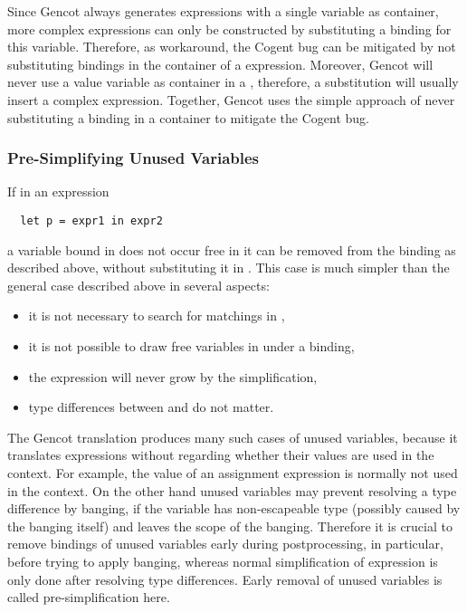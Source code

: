 Since Gencot always generates  expressions with a single variable as container, more complex expressions can
only be constructed by substituting a binding for this variable. Therefore, as workaround, the Cogent bug can be mitigated by
not substituting bindings in the container of a  expression. Moreover, Gencot will never use a value variable
as container in a , therefore, a substitution will usually insert a complex expression. Together, Gencot uses the
simple approach of never substituting a binding in a  container to mitigate the Cogent bug.

\subsubsection{Pre-Simplifying Unused Variables}

If in an expression
\begin{verbatim}
  let p = expr1 in expr2
\end{verbatim}
a variable bound in  does not occur free in  it can be removed from the binding  as described above,
without substituting it in . This case is much simpler than the general case described above in several aspects:
\begin{itemize}
\item it is not necessary to search for matchings in ,
\item it is not possible to draw free variables in  under a binding,
\item the expression will never grow by the simplification,
\item type differences between  and  do not matter.
\end{itemize}

The Gencot translation produces many such cases of unused variables, because it translates expressions without regarding whether
their values are used in the context. For example, the value of an assignment expression is normally not used in the context. On the
other hand unused variables may prevent resolving a type difference by banging, if the variable has non-escapeable type (possibly
caused by the banging itself) and leaves the scope of the banging. Therefore it is crucial to remove bindings of unused variables
early during postprocessing, in particular, before trying to apply banging, whereas normal simplification of  expression
is only done after resolving type differences. Early removal of unused variables is called pre-simplification here.

